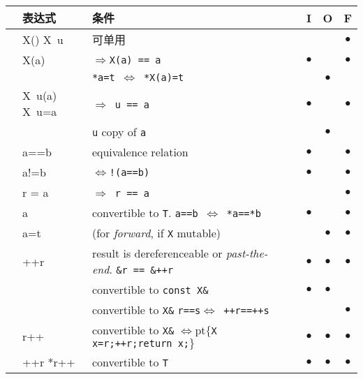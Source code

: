 \documentclass[c5size,landscape,twoside,a4paper]{ctexart}
\newcommand{\<}{\ensuremath{\langle}}
\renewcommand{\>}{\ensuremath{\rangle}}
\newcommand{\hs}[1][1]{\hskip #1pt}
\newcommand{\mblt}{\(\bullet\)}
\newcommand{\lra}{\(\Leftrightarrow\)}
\newcommand{\ra}{\(\Rightarrow\)}
\newcommand{\lb}{\(\{\)} %
\newcommand{\rb}{\(\}\)} %
\begin{document}
\begin{multicols}{4}
{
\setlength{\tabcolsep}{1pt}
\raggedright
\begin{tabular}{|p{0pt} @{\enskip}>{\raggedright\ttfamily}p{.9cm}@{\enskip}|
                 @{\enskip}>{\raggedright}p{3.5cm} p{0pt}|c|c|c|}
\hline
&\textbf{表达式} & \textbf{条件} && \textbf{I} & \textbf{O} & \textbf{F} \\ \hline
&X() \mbox{X u} & 可单用      &&       &       & \mblt \\ \hline
&X(a) & \ra \texttt{X(a) == a}           && \mblt &       & \mblt \\ \cline{3-7}
&     & \texttt{*a=t \lra\ *X(a)=t}      &&       & \mblt &       \\ \hline
&\mbox{X u(a)}
\mbox{X u=a} & \ra\ \texttt{u == a}      && \mblt &       & \mblt \\ \cline{3-7}
&%
             & \texttt{u} copy of
               \texttt{a}                &&       & \mblt &       \\ \hline
&a==b         & equivalence relation     && \mblt &       & \mblt \\ \hline
&a!=b         & \lra \texttt{!(a==b)}    && \mblt &       & \mblt \\ \hline
&r = a        & \ra\ \texttt{r == a}     &&       &       & \mblt \\ \hline
&*a         & convertible to \texttt{T}.
       \mbox{\texttt{a==b \lra\ *a==*b}} && \mblt &       & \mblt \\ \hline
&*a=t         & (for \emph{forward},
                if \texttt{X} mutable)   &&       & \mblt & \mblt \\ \hline
&++r        & result is dereferenceable
               or \emph{past-the-end}.
               \texttt{\&r == \&++r}     && \mblt & \mblt & \mblt \\ \cline{3-7}
&             & convertible to
               \texttt{const X\&}        && \mblt & \mblt &       \\ \cline{3-7}
&          & convertible to \texttt{X\&}
 \mbox{\texttt{r==s}\lra\ \texttt{++r==++s}}  
                                         &&       &       & \mblt \\ \hline

&r++        & convertible to \texttt{X\&}
   \mbox{\lra\hs\texttt{\lb X x=r;++r;return x;\rb}} 
                                         && \mblt  & \mblt & \mblt \\ \hline
&*++r *r++  & convertible to \texttt{T}  && \mblt  & \mblt & \mblt \\ \hline
\end{tabular}
}


\end{multicols}
\end{document}
